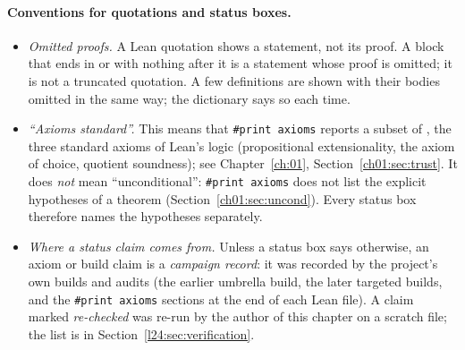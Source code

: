 \paragraph{Conventions for quotations and status boxes.}
\begin{itemize}
\item \emph{Omitted proofs.} A Lean quotation shows a statement, not its proof. A block that ends in
  \lean{:=} or  with nothing after it is a statement whose proof is omitted; it is not a truncated
  quotation. A few definitions are shown with their bodies omitted in the same way; the dictionary says so
  each time.
\item \emph{``Axioms standard''.} This means that \texttt{\#print axioms} reports a subset of
  , the three standard axioms of Lean's logic (propositional
  extensionality, the axiom of choice, quotient soundness); see Chapter~\ref{ch:01},
  Section~\ref{ch01:sec:trust}. It does \emph{not} mean ``unconditional'': \texttt{\#print axioms} does not
  list the explicit hypotheses of a theorem (Section~\ref{ch01:sec:uncond}). Every status box therefore names
  the hypotheses separately.
\item \emph{Where a status claim comes from.} Unless a status box says otherwise, an axiom or build claim
  is a \emph{campaign record}: it was recorded by the project's own builds and audits (the earlier umbrella
  build, the later targeted builds, and the \texttt{\#print axioms} sections at the end of each Lean file). A claim marked
  \emph{re-checked} was re-run by the author of this chapter on a scratch file; the list is in
  Section~\ref{l24:sec:verification}.
\end{itemize}

